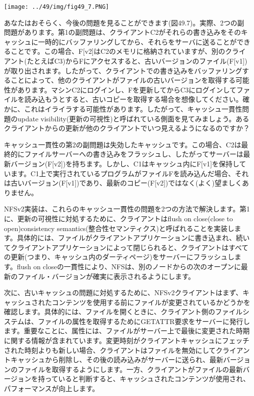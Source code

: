 \texttt{[image: ../49/img/fig49\_7.PNG]}

あなたはおそらく、今後の問題を見ることができます(図49.7)。実際、2つの副問題があります。第1の副問題は、クライアントC2がそれらの書き込みをそのキャッシュに一時的にバッファリングしてから、それらをサーバに送ることができることです。この場合、F{[}v2{]}はC2のメモリに格納されていますが、別のクライアント(たとえばC3)からFにアクセスすると、古いバージョンのファイル(F{[}v1{]})が取り出されます。したがって、クライアントでの書き込みをバッファリングすることによって、他のクライアントがファイルの古いバージョンを取得する可能性があります。マシンC2にログインし、Fを更新してからC3にログインしてファイルを読み込もうとすると、古いコピーを取得する場合を想像してください。確かに、これはイライラする可能性があります。したがって、キャッシュ一貫性問題のupdate
visibility(更新の可視性)と呼ばれている側面を見てみましょう。あるクライアントからの更新が他のクライアントでいつ見えるようになるのですか？

キャッシュ一貫性の第2の副問題は失効したキャッシュです。この場合、C2は最終的にファイルサーバーへの書き込みをフラッシュし、したがってサーバーは最新バージョン(F{[}v2{]})を持ちます。しかし、C1はキャッシュ内にF{[}v1{]}を保持しています。C1上で実行されているプログラムがファイルFを読み込んだ場合、それは古いバージョン(F{[}v1{]})であり、最新のコピー(F{[}v2{]})ではなく(よく)望ましくありません。

NFSv2実装は、これらのキャッシュ一貫性の問題を2つの方法で解決します。第1に、更新の可視性に対処するために、クライアントはflush
on close(close to open)consistency
semantics(整合性セマンティクス)と呼ばれることを実装します。具体的には、ファイルがクライアントアプリケーションに書き込まれ、続いてクライアントアプリケーションによって閉じられると、クライアントはすべての更新(つまり、キャッシュ内のダーティページ)をサーバーにフラッシュします。flush
on
closeの一貫性により、NFSは、別のノードからの次のオープンに最新のファイル・バージョンが確実に表示されるようにします。

次に、古いキャッシュの問題に対処するために、NFSv2クライアントはまず、キャッシュされたコンテンツを使用する前にファイルが変更されているかどうかを確認します。具体的には、ファイルを開くときに、クライアント側のファイルシステムは、ファイルの属性を取得するためにGETATTR要求をサーバーに発行します。重要なことに、属性には、ファイルがサーバー上で最後に変更された時期に関する情報が含まれています。変更時刻がクライアントキャッシュにフェッチされた時刻よりも新しい場合、クライアントはファイルを無効にしてクライアントキャッシュから削除し、その後の読み込みがサーバーに送られ、最新バージョンのファイルを取得するようにします。一方、クライアントがファイルの最新バージョンを持っていると判断すると、キャッシュされたコンテンツが使用され、パフォーマンスが向上します。

